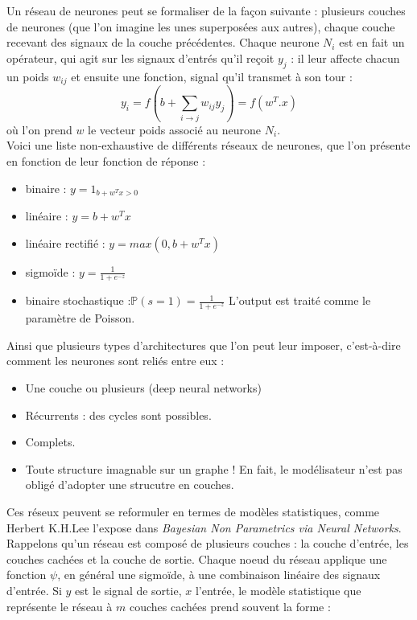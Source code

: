 \documentclass{article}
\begin{document}
Un réseau de neurones peut se formaliser de la façon suivante : plusieurs couches de neurones (que l'on imagine les unes superposées aux autres), chaque couche recevant des signaux de la couche précédentes. Chaque neurone $N_i$ est en fait un opérateur, qui agit sur les signaux d'entrés qu'il reçoit $y_j$ : il leur affecte chacun un poids $w_{ij}$ et ensuite une fonction, signal qu'il transmet à son tour :
\[y_i=f(b+\sum_{i\rightarrow j}w_{ij}y_j)=f(w^T.x)\]
où l'on prend $w$ le vecteur poids associé au neurone $N_i$.\\

Voici une liste non-exhaustive de différents réseaux de neurones, que l'on présente en fonction de leur fonction de réponse :
\begin{itemize}
\item binaire : $y=1_{b+w^Tx>0}$
\item linéaire : $y=b+w^Tx$
\item linéaire rectifié : $y=max(0,b+w^Tx)$
\item sigmoïde : $y=\frac{1}{1+e^{-z}}$
\item binaire stochastique :$\mathbb P(s=1)=\frac{1}{1+e^{-z}}$ L'output est traité comme le paramètre de Poisson.\\
\end{itemize}

Ainsi que plusieurs types d'architectures que l'on peut leur imposer, c'est-à-dire comment les neurones sont reliés entre eux :
\begin{itemize}
\item Une couche ou plusieurs (deep neural networks)
\item Récurrents : des cycles sont possibles.
\item Complets.
\item Toute structure imagnable sur un graphe ! En fait, le modélisateur n'est pas obligé d'adopter une strucutre en couches.\\
\end{itemize}

Ces réseux peuvent se reformuler en termes de modèles statistiques, comme Herbert K.H.Lee l'expose dans \textit{Bayesian Non Parametrics via Neural Networks}. Rappelons qu'un réseau est composé de plusieurs couches : la couche d'entrée, les couches cachées et la couche de sortie. Chaque noeud du réseau applique une fonction $\psi$, en général une sigmoïde, à une combinaison linéaire des signaux d'entrée. Si $y$ est le signal de sortie, $x$ l'entrée, le modèle statistique que représente le réseau à $m$ couches cachées prend souvent la forme :
\end{document}
